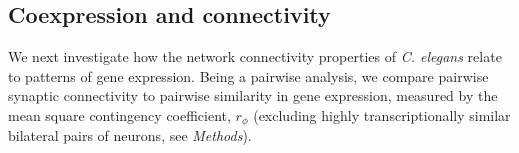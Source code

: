 \documentclass[10pt,letterpaper]{article}
\begin{document}
\subsection*{Coexpression and connectivity}

We next investigate how the network connectivity properties of \emph{C. elegans} relate to patterns of gene expression.
Being a pairwise analysis, we compare pairwise synaptic connectivity to pairwise similarity in gene expression, measured by the mean square contingency coefficient, $r_\phi$ (excluding highly transcriptionally similar bilateral pairs of neurons, see \emph{Methods}).

\end{document}
